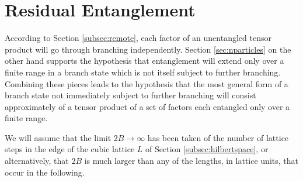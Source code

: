 \documentclass[12pt,amsmath,amssymb,onecolumn]{revtex4-2}
\begin{document}
\section{\label{sec:residual} Residual Entanglement}

According to Section \ref{subsec:remote},
each factor of an unentangled tensor product will go through branching
independently. Section \ref{sec:nparticles}
on the other hand supports the hypothesis 
that entanglement will extend only over
a finite range in a branch state which is not itself subject to further
branching. Combining these pieces leads to the hypothesis that
the most general form of a branch state not immediately subject to
further branching will consist approximately of a tensor
product of a set of factors each entangled only over a finite range.

We will assume that the limit $2 B \rightarrow \infty$ has been
taken of the number of lattice steps in the edge
of the cubic lattice $L$ of Section \ref{subsec:hilbertspace}, or
alternatively, that $2 B$ is much larger than any of the
lengths, in lattice units, that occur in the following.
\end{document}
